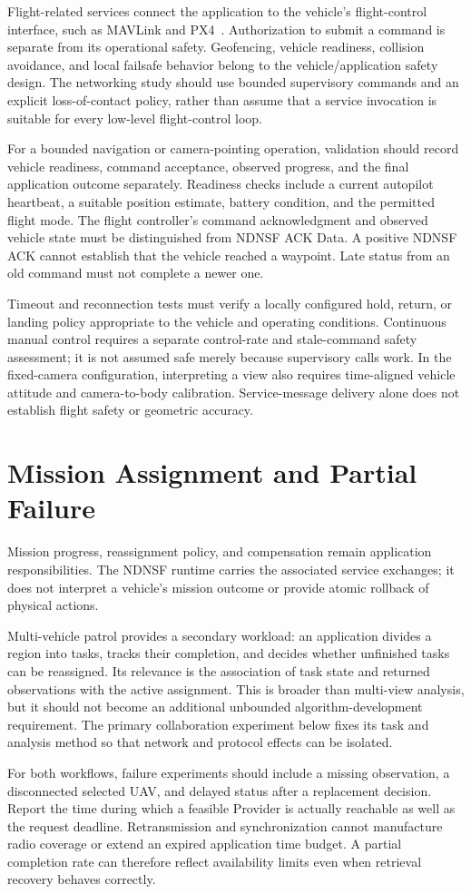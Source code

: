 Flight-related services connect the application to the vehicle's flight-control interface, such as MAVLink and PX4~\cite{mavlink-survey,px4}. Authorization to submit a command is separate from its operational safety. Geofencing, vehicle readiness, collision avoidance, and local failsafe behavior belong to the vehicle/application safety design. The networking study should use bounded supervisory commands and an explicit loss-of-contact policy, rather than assume that a service invocation is suitable for every low-level flight-control loop.

For a bounded navigation or camera-pointing operation, validation should record vehicle readiness, command acceptance, observed progress, and the final application outcome separately. Readiness checks include a current autopilot heartbeat, a suitable position estimate, battery condition, and the permitted flight mode. The flight controller's command acknowledgment and observed vehicle state must be distinguished from NDNSF ACK Data. A positive NDNSF ACK cannot establish that the vehicle reached a waypoint. Late status from an old command must not complete a newer one.

Timeout and reconnection tests must verify a locally configured hold, return, or landing policy appropriate to the vehicle and operating conditions. Continuous manual control requires a separate control-rate and stale-command safety assessment; it is not assumed safe merely because supervisory calls work. In the fixed-camera configuration, interpreting a view also requires time-aligned vehicle attitude and camera-to-body calibration. Service-message delivery alone does not establish flight safety or geometric accuracy.

\section{Mission Assignment and Partial Failure}
Mission progress, reassignment policy, and compensation remain application responsibilities. The NDNSF runtime carries the associated service exchanges; it does not interpret a vehicle's mission outcome or provide atomic rollback of physical actions.

Multi-vehicle patrol provides a secondary workload: an application divides a region into tasks, tracks their completion, and decides whether unfinished tasks can be reassigned. Its relevance is the association of task state and returned observations with the active assignment. This is broader than multi-view analysis, but it should not become an additional unbounded algorithm-development requirement. The primary collaboration experiment below fixes its task and analysis method so that network and protocol effects can be isolated.

For both workflows, failure experiments should include a missing observation, a disconnected selected UAV, and delayed status after a replacement decision. Report the time during which a feasible Provider is actually reachable as well as the request deadline. Retransmission and synchronization cannot manufacture radio coverage or extend an expired application time budget. A partial completion rate can therefore reflect availability limits even when retrieval recovery behaves correctly.
